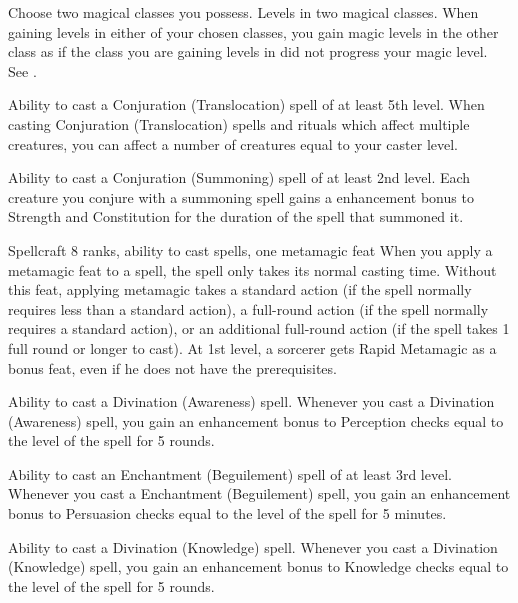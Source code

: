 Choose two magical classes you possess.
 Levels in two magical classes.
 When gaining levels in either of your chosen classes, you gain magic levels in the other class as if the class you are gaining levels in did not progress your magic level. See .

\featpre Ability to cast a Conjuration (Translocation) spell of at least 5th level.
\featben When casting Conjuration (Translocation) spells and rituals which affect multiple creatures, you can affect a number of creatures equal to your caster level.

 Ability to cast a Conjuration (Summoning) spell of at least 2nd level.
 Each creature you conjure with a summoning spell gains a  enhancement bonus to Strength and Constitution for the duration of the spell that summoned it.

 Spellcraft 8 ranks, ability to cast spells, one metamagic feat
 When you apply a metamagic feat to a spell, the spell only takes its normal casting time.
 Without this feat, applying metamagic takes a standard action (if the spell normally requires less than a standard action), a full-round action (if the spell normally requires a standard action), or an additional full-round action (if the spell takes 1 full round or longer to cast).
 At 1st level, a sorcerer gets Rapid Metamagic as a bonus feat, even if he does not have the prerequisites.

\featpre Ability to cast a Divination (Awareness) spell.
\featben Whenever you cast a Divination (Awareness) spell, you gain an enhancement bonus to Perception checks equal to the level of the spell for 5 rounds.

\featpre Ability to cast an Enchantment (Beguilement) spell of at least 3rd level.
\featben Whenever you cast a Enchantment (Beguilement) spell, you gain an enhancement bonus to Persuasion checks equal to the level of the spell for 5 minutes.

\featpre Ability to cast a Divination (Knowledge) spell.
\featben Whenever you cast a Divination (Knowledge) spell, you gain an enhancement bonus to Knowledge checks equal to the level of the spell for 5 rounds.


